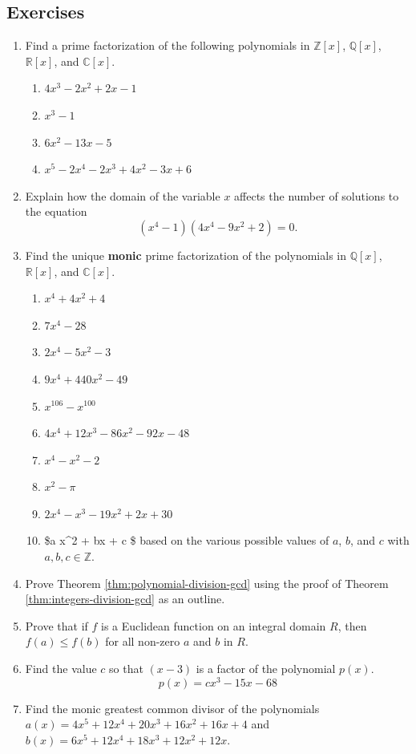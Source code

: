 \documentclass[
]{book}
\providecommand{\tightlist}{%
  \setlength{\itemsep}{0pt}\setlength{\parskip}{0pt}}
\theoremstyle{definition}
\theoremstyle{definition}
\theoremstyle{definition}
\theoremstyle{definition}
\theoremstyle{remark}
\begin{document}
\hypertarget{exercises-25}{%
\subsection{Exercises}\label{exercises-25}}

\begin{enumerate}
\def\labelenumi{\arabic{enumi}.}
\item
  Find a prime factorization of the following polynomials in \(\mathbb{Z}[x]\), \(\mathbb{Q}[x]\), \(\mathbb{R}[x]\), and \(\mathbb{C}[x]\).

  \begin{enumerate}
  \def\labelenumii{\alph{enumii}.}
  \tightlist
  \item
    \(4x^3-2x^2+2x-1\)
  \item
    \(x^3-1\)
  \item
    \(6x^2-13x-5\)
  \item
    \(x^5-2x^4-2x^3+4x^2-3x+6\)
  \end{enumerate}
\item
  Explain how the domain of the variable \(x\) affects the number of solutions to the equation \[(x^4-1)(4x^4-9x^2+2)=0.\]
\item
  Find the unique \textbf{monic} prime factorization of the polynomials in \(\mathbb{Q}[x]\), \(\mathbb{R}[x]\), and \(\mathbb{C}[x]\).

  \begin{enumerate}
  \def\labelenumii{\alph{enumii}.}
  \tightlist
  \item
    \(x^4+4x^2+4\)
  \item
    \(7x^4-28\)
  \item
    \(2x^4-5x^2-3\)
  \item
    \(9x^4+440 x^2-49\)
  \item
    \(x^{106} -x^{100}\)
  \item
    \(4x^4+12x^3-86x^2-92x-48\)
  \item
    \(x^4-x^2-2\)
  \item
    \(x^2-\pi\)
  \item
    \(2x^4-x^3-19x^2+2x+30\)
  \item
    \$a x\^{}2 + bx + c \$ based on the various possible values of \(a\), \(b\), and \(c\) with \(a,b,c \in \mathbb{Z}\).
  \end{enumerate}
\item
  Prove Theorem \ref{thm:polynomial-division-gcd} using the proof of Theorem \ref{thm:integers-division-gcd} as an outline.
\item
  Prove that if \(f\) is a Euclidean function on an integral domain \(R\), then \(f(a)\leq f(b)\) for all non-zero \(a\) and \(b\) in \(R\).
\item
  Find the value \(c\) so that \((x-3)\) is a factor of the polynomial \(p(x)\). \[p(x)=cx^3-15x-68\]
\item
  Find the monic greatest common divisor of the polynomials \(a(x)=4x^5+12x^4+20x^3+16x^2+16x+4\) and \(b(x)=6x^5+12x^4+18x^3+12x^2+12x\).
\end{enumerate}
\end{document}
